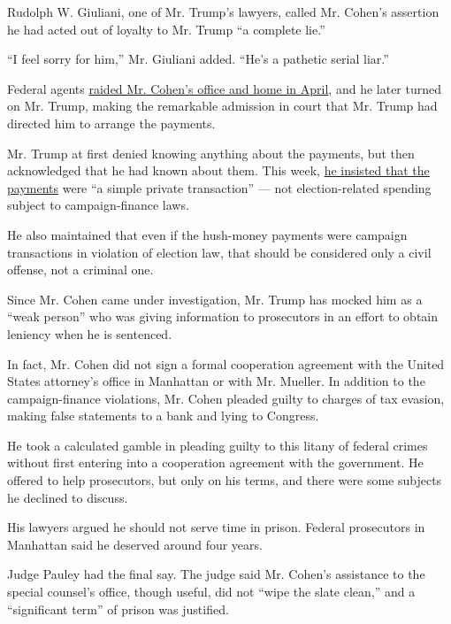 Rudolph W. Giuliani, one of Mr. Trump's lawyers, called Mr. Cohen's
assertion he had acted out of loyalty to Mr. Trump ``a complete lie.''

``I feel sorry for him,'' Mr. Giuliani added. ``He's a pathetic serial
liar.''

Federal agents
\href{https://www.nytimes3xbfgragh.onion/2018/04/09/us/politics/fbi-raids-office-of-trumps-longtime-lawyer-michael-cohen.html}{raided
Mr. Cohen's office and home in April}, and he later turned on Mr. Trump,
making the remarkable admission in court that Mr. Trump had directed him
to arrange the payments.

Mr. Trump at first denied knowing anything about the payments, but then
acknowledged that he had known about them. This week,
\href{https://www.nytimes3xbfgragh.onion/2018/12/10/us/politics/trump-campaign-finance-crimes-defense.html}{he
insisted that the payments} were ``a simple private transaction'' ---
not election-related spending subject to campaign-finance laws.

He also maintained that even if the hush-money payments were campaign
transactions in violation of election law, that should be considered
only a civil offense, not a criminal one.

Since Mr. Cohen came under investigation, Mr. Trump has mocked him as a
``weak person'' who was giving information to prosecutors in an effort
to obtain leniency when he is sentenced.

In fact, Mr. Cohen did not sign a formal cooperation agreement with the
United States attorney's office in Manhattan or with Mr. Mueller. In
addition to the campaign-finance violations, Mr. Cohen pleaded guilty to
charges of tax evasion, making false statements to a bank and lying to
Congress.

He took a calculated gamble in pleading guilty to this litany of federal
crimes without first entering into a cooperation agreement with the
government. He offered to help prosecutors, but only on his terms, and
there were some subjects he declined to discuss.

His lawyers argued he should not serve time in prison. Federal
prosecutors in Manhattan said he deserved around four years.

Judge Pauley had the final say. The judge said Mr. Cohen's assistance to
the special counsel's office, though useful, did not ``wipe the slate
clean,'' and a ``significant term'' of prison was justified.

\href{https://www.nytimes3xbfgragh.onion/interactive/2018/08/21/us/mueller-trump-charges.html}{}

